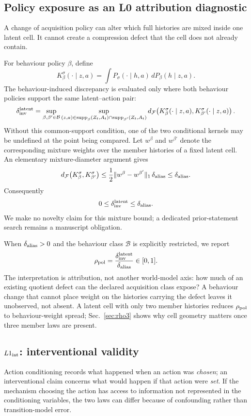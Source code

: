 \documentclass[10pt]{article}
\newcommand{\dF}{d_{\mathcal F}}
\begin{document}
\subsection{Policy exposure as an L0 attribution diagnostic}

A change of acquisition policy can alter which full histories are mixed inside one latent cell. It cannot create a compression defect that the cell does not already contain.

For behaviour policy $\beta$, define
\[
K_\beta^\sigma(\cdot\mid z,a)
=
\int P_\sigma(\cdot\mid h,a)\,dP_\beta(h\mid z,a).
\]
The behaviour-induced discrepancy is evaluated only where both behaviour policies support the same latent--action pair:
\[
\delta_{\rm inv}^{\rm latent}
=
\sup_{\beta,\beta'\in\mathcal B}
\sup_{(z,a)\in \mathrm{supp}_\beta(Z_t,A_t)\cap\mathrm{supp}_{\beta'}(Z_t,A_t)}
\dF\!\left(
K_\beta^\sigma(\cdot\mid z,a),
K_{\beta'}^\sigma(\cdot\mid z,a)
\right).
\]
Without this common-support condition, one of the two conditional kernels may be undefined at the point being compared. Let $w^\beta$ and $w^{\beta'}$ denote the corresponding mixture weights over the member histories of a fixed latent cell. An elementary mixture-diameter argument gives
\[
\dF\!\left(K_\beta^\sigma,K_{\beta'}^\sigma\right)
\le
\frac12\lVert w^\beta-w^{\beta'}\rVert_1\,\delta_{\rm alias}
\le \delta_{\rm alias}.
\]
Consequently
\[
0\le \delta_{\rm inv}^{\rm latent}\le\delta_{\rm alias}.
\]
We make no novelty claim for this mixture bound; a dedicated prior-statement search remains a manuscript obligation.

When $\delta_{\rm alias}>0$ and the behaviour class $\mathcal B$ is explicitly restricted, we report
\[
\rho_{\rm pol}
=
\frac{\delta_{\rm inv}^{\rm latent}}{\delta_{\rm alias}}
\in[0,1].
\]
The interpretation is attribution, not another world-model axis: how much of an existing quotient defect can the declared acquisition class expose? A behaviour change that cannot place weight on the histories carrying the defect leaves it unobserved, not absent. A latent cell with only two member histories reduces $\rho_{\rm pol}$ to behaviour-weight spread; Sec.~\ref{sec:rho3} shows why cell geometry matters once three member laws are present.

\subsection{$L1_{\rm int}$: interventional validity}

Action conditioning records what happened when an action was \emph{chosen}; an interventional claim concerns what would happen if that action were \emph{set}. If the mechanism choosing the action has access to information not represented in the conditioning variables, the two laws can differ because of confounding rather than transition-model error.
\end{document}
